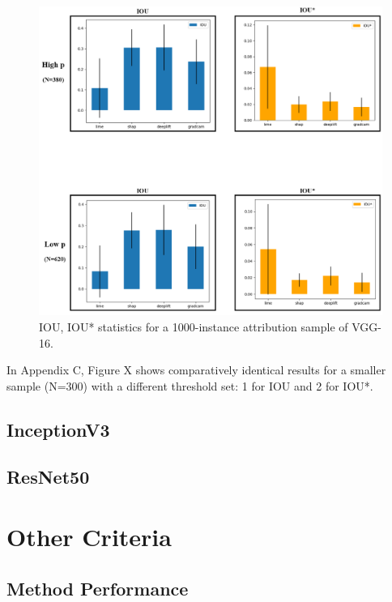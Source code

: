 \documentclass[main]{subfiles}
\begin{document}
\begin{figure}[h]\centering
\vfill
\includegraphics[scale=0.32]{vgg_0_5_and_1.png}
\caption{IOU, IOU* statistics for a 1000-instance attribution sample of VGG-16. }
\label{vggAfig}
\vfill
\end{figure}

In Appendix C, Figure X shows comparatively identical results for a smaller sample (N=300) with a different threshold set: 1 for IOU and 2 for IOU*.

\newpage



\subsection{InceptionV3}




\subsection{ResNet50}


\newpage
\section{Other Criteria}
\subsection{Method Performance}
\end{document}
